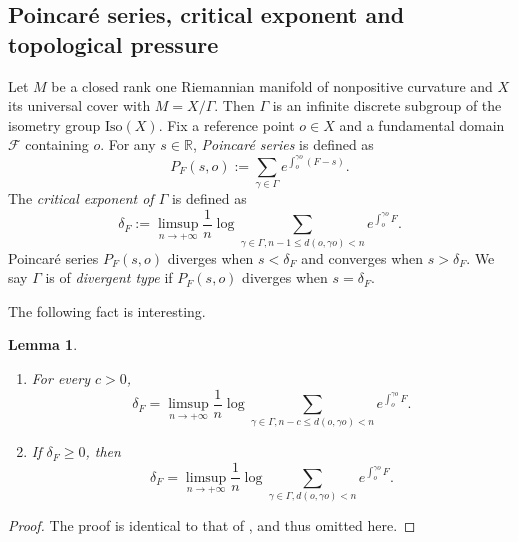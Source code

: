\documentclass[11pt]{amsart}
\newtheorem{lemma}[theorem]{Lemma}
\newtheorem{proposition}[theorem]{Proposition}
\theoremstyle{definition}
\newcommand{\F}{\mathcal{F}}
\newcommand{\UR}{\mathcal{UR}}
\def\c{\gamma}   \def\C{\Gamma}
\def\d{\delta}   %
\def\l{\lambda}   \def\L{\Lambda}
\begin{document}
\subsection{Poincar\'{e} series, critical exponent and topological pressure}
Let $M$ be a closed rank one Riemannian manifold of nonpositive curvature and $X$ its universal cover with $M=X/\Gamma$. Then $\Gamma$ is an infinite discrete subgroup of the isometry group $\text{Iso}(X)$. Fix a reference point $o\in X$ and a fundamental domain $\F$ containing $o$. For any $s \in \mathbb{R}$, \emph{Poincar\'e series} is defined as
\begin{equation*}
P_F(s,o):= \sum_{\c \in \Gamma}e^{\int_o^{\c o}(F-s)}.
\end{equation*}
The \emph{critical exponent of $\Gamma$} is defined as
$$\delta_F:=\limsup_{n\to +\infty}\frac{1}{n}\log \sum_{\c \in \Gamma, n-1\le d(o, \c o)<n}e^{\int_o^{\c o}F}.$$
Poincar\'{e} series $P_F(s,o)$ diverges when $s<\delta_F$ and converges when  $s>\delta_F$. We say $\Gamma$ is of \emph{divergent type} if $P_F(s,o)$ diverges when $s=\delta_F$.


The following fact is interesting.
\begin{lemma}\label{criticalexponent}
\begin{enumerate}
    \item For every $c>0$, 
    $$\delta_F=\limsup_{n\to +\infty}\frac{1}{n}\log \sum_{\c \in \Gamma, n-c\le d(o, \c o)<n}e^{\int_o^{\c o}F}.$$
\item If $\d_F\ge 0$, then
 $$\delta_F=\limsup_{n\to +\infty}\frac{1}{n}\log \sum_{\c \in \Gamma,  d(o, \c o)<n}e^{\int_o^{\c o}F}.$$
\end{enumerate}   
\end{lemma}
\begin{proof}
The proof is identical to that of \cite[Lemma 3.3(vii)]{PPS}, and thus omitted here.
\end{proof}
\end{document}
